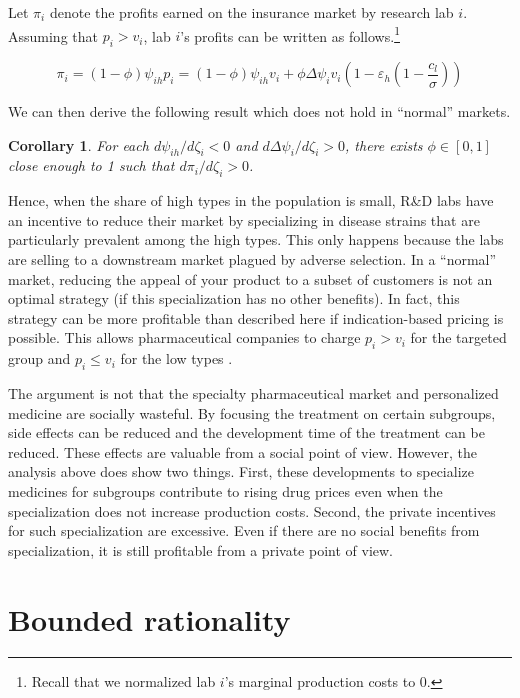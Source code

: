 \documentclass[a4paper,12pt]{article}
\newtheorem{corollary}{Corollary}
\begin{document}
Let \(\pi_i\) denote the profits earned on the insurance market by research lab \(i\). Assuming that \(p_i>v_i\), lab \(i\)'s profits can be written as follows.\footnote{Recall that we normalized lab \(i\)'s marginal production costs to 0.}

\begin{equation}
\label{eq:38}
\pi_i = (1-\phi)\psi_{ih}p_i=(1-\phi)\psi_{ih}v_i+\phi\Delta\psi_iv_i (1-\varepsilon_h(1-\frac{c_l}{\sigma}))
\end{equation}

We can then derive the following result which does not hold in ``normal'' markets.

\begin{corollary}
\label{Targeting_profitable}
For each \(d\psi_{ih}/d\zeta_i<0\) and \(d\Delta\psi_i/d\zeta_i>0\), there exists \(\phi \in [0,1]\) close enough to 1 such that \(d\pi_i/d\zeta_i>0\).
\end{corollary}

Hence, when the share of high types in the population is small, R\&D labs have an incentive to reduce their market by specializing in disease strains that are particularly prevalent among the high types. This only happens because the labs are selling to a downstream market plagued by adverse selection. In a ``normal'' market, reducing the appeal of your product to a subset of customers is not an optimal strategy (if this specialization has no other benefits). In fact, this strategy can be more profitable than described here if indication-based pricing is possible. This allows pharmaceutical companies to charge \(p_i > v_i\) for the targeted group and \(p_i \leq v_i\) for the low types \citep{NBERc13994}.

The argument is not that the specialty pharmaceutical market and personalized medicine are socially wasteful. By focusing the treatment on certain subgroups, side effects can be reduced and the development time of the treatment can be reduced. These effects are valuable from a social point of view. However, the analysis above does show two things. First, these developments to specialize medicines for subgroups contribute to rising drug prices even when the specialization does not increase production costs. Second, the private incentives for such specialization are excessive. Even if there are no social benefits from specialization, it is still profitable from a private point of view.


\section{Bounded rationality}
\label{sec:orgf3f6c36}
\end{document}
